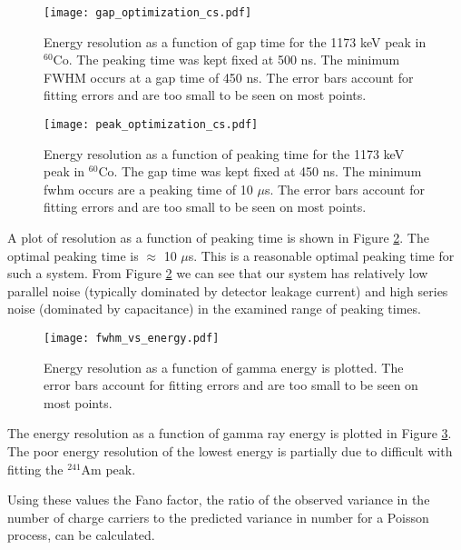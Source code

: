 \begin{figure}
\begin{centering}
\texttt{[image: gap\_optimization\_cs.pdf]}
\caption{Energy resolution as a function of gap time for the 1173 keV peak in ${}^{60}$Co. The peaking time was kept fixed at 500 ns. The minimum FWHM occurs at a gap time of 450 ns. The error bars account for fitting errors and are too small to be seen on most points.}
\label{gap}
\end{centering}
\end{figure}
\begin{figure}
\begin{centering}
\texttt{[image: peak\_optimization\_cs.pdf]}
\caption{Energy resolution as a function of peaking time for the 1173 keV peak in ${}^{60}$Co. The gap time was kept fixed at 450 ns. The minimum fwhm occurs are a peaking time of 10 $\mu$s. The error bars account for fitting errors and are too small to be seen on most points.}
\label{peak}
\end{centering}
\end{figure}

A plot of resolution as a function of peaking time is shown in Figure \ref{peak}. The optimal peaking time is $\approx $ 10 $\mu$s. This is a reasonable optimal peaking time for such a system. From Figure \ref{peak} we can see that our system has relatively low parallel noise (typically dominated by detector leakage current) and high series noise (dominated by capacitance) in the examined range of peaking times.

\begin{figure}
\begin{centering}
\texttt{[image: fwhm\_vs\_energy.pdf]}
\caption{Energy resolution as a function of gamma energy is plotted. The error bars account for fitting errors and are too small to be seen on most points.}
\label{eres}
\end{centering}
\end{figure}

The energy resolution as a function of gamma ray energy is plotted in Figure \ref{eres}. The poor energy resolution of the lowest energy is partially due to difficult with fitting the ${}^{241}$Am peak.

Using these values the Fano factor, the ratio of the observed variance in the number of charge carriers to the predicted variance in number for a Poisson process, can be calculated.

